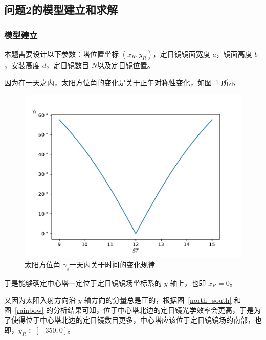 \subsection{问题2的模型建立和求解}
\subsubsection{模型建立}
本题需要设计以下参数：塔位置坐标 \((x_{R}, y_{R})\)，定日镜镜面宽度 \(a\)，镜面高度 \(b\)，安装高度 \(d\)，定日镜数目 \(N\)以及定日镜位置。

因为在一天之内，太阳方位角的变化是关于正午对称性变化，如图~\ref{model_2_1} 所示
\begin{figure}[H]
\centering
\includegraphics[scale = 0.4]{gammas.pdf}
\caption{\kaishu 太阳方位角 \(\gamma_{s}\)一天内关于时间的变化规律}
\label{model_2_1}
\end{figure}
于是能够确定中心塔一定位于定日镜镜场坐标系的 \(y\) 轴上，也即 \(x _{R} = 0\)。

又因为太阳入射方向沿 \(y\) 轴方向的分量总是正的，根据图~\ref{north_south} 和图~\ref{rainbow} 的分析结果可知，位于中心塔北边的定日镜光学效率会更高，于是为了使得位于中心塔北边的定日镜数目更多，中心塔应该位于定日镜镜场的南部，也即，\(y _{R} \in [-350 , 0]\)。


